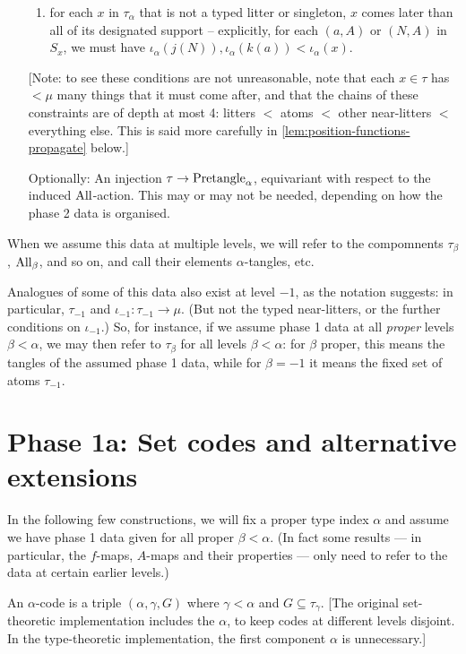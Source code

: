 \begin{definition}
\begin{enumerate}
\begin{enumerate}
      \item for each $x$ in $\tau_\alpha$ that is not a typed litter or singleton, $x$ comes later than all of its designated support -- explicitly, for each $(a,A)$ or $(N,A)$ in $S_x$, we must have $\iota_\alpha(j(N)), \iota_\alpha(k(a))<\iota_\alpha(x)$.
    \end{enumerate}
    [Note: to see these conditions are not unreasonable, note that each $x \in \tau$ has $<\mu$ many things that it must come after, and that the chains of these constraints are of depth at most 4: litters $<$ atoms $<$ other near-litters $<$ everything else.  This is said more carefully in \cref{lem:position-functions-propagate} below.]
    \item [Optionally: An injection $\tau \to \mathrm{Pretangle}_\alpha$, equivariant with respect to the induced $\mathrm{All}$-action.  This may or may not be needed, depending on how the phase 2 data is organised.]
  \end{enumerate}
\end{definition}

When we assume this data at multiple levels, we will refer to the compomnents $\tau_\beta$, $\mathrm{All}_\beta$, and so on, and call their elements $\alpha$-tangles, etc.

Analogues of some of this data also exist at level $-1$, as the notation suggests: in particular, $\tau_{-1}$ and $\iota_{-1} : \tau_{-1} \to \mu$.  (But not the typed near-litters, or the further conditions on $\iota_{-1}$.) So, for instance, if we assume phase 1 data at all \emph{proper} levels $\beta < \alpha$, we may then refer to $\tau_\beta$ for all levels $\beta < \alpha$: for $\beta$ proper, this means the tangles of the assumed phase 1 data, while for $\beta = -1$ it means the fixed set of atoms $\tau_{-1}$.

\section{Phase 1a: Set codes and alternative extensions}

In the following few constructions, we will fix a proper type index $\alpha$ and assume we have phase 1 data given for all proper $\beta < \alpha$. (In fact some results --- in particular, the $f$-maps, $A$-maps and their properties --- only need to refer to the data at certain earlier levels.)

\begin{definition}
\label {def:code}
\leanok
An $\alpha$-code is a triple $(\alpha,\gamma,G)$ where $\gamma<\alpha$ and $G \subseteq \tau_\gamma$. [The original set-theoretic implementation includes the $\alpha$, to keep codes at different levels disjoint.  In the type-theoretic implementation, the first component $\alpha$ is unnecessary.]
\end{definition}

